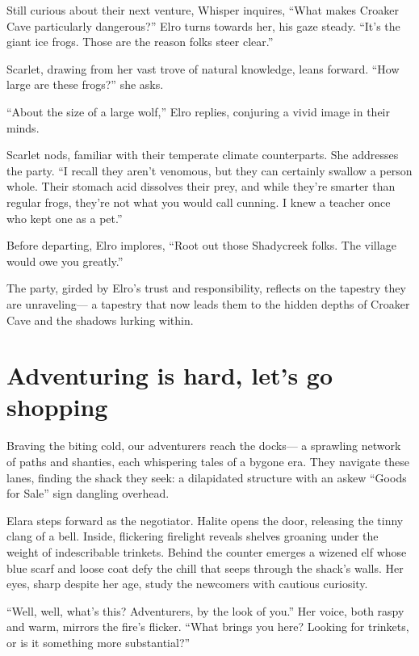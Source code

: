 \documentclass[
  letterpaper,12pt,twoside,twocolumn,openany,
  nodeprecatedcode,bg=full]{dndbook}
\begin{document}
Still curious about their next venture, Whisper inquires, ``What makes
Croaker Cave particularly dangerous?'' Elro turns towards her, his gaze
steady. ``It's the giant ice frogs. Those are the reason folks steer
clear.''

Scarlet, drawing from her vast trove of natural knowledge, leans
forward. ``How large are these frogs?'' she asks.

``About the size of a large wolf,'' Elro replies, conjuring a vivid
image in their minds.

Scarlet nods, familiar with their temperate climate counterparts. She
addresses the party. ``I recall they aren't venomous, but they can
certainly swallow a person whole. Their stomach acid dissolves their
prey, and while they're smarter than regular frogs, they're not what you
would call cunning. I knew a teacher once who kept one as a pet.''

Before departing, Elro implores, ``Root out those Shadycreek folks. The
village would owe you greatly.''

The party, girded by Elro's trust and responsibility, reflects on the
tapestry they are unraveling--- a tapestry that now leads them to the
hidden depths of Croaker Cave and the shadows lurking within.

\section{Adventuring is hard, let's go
shopping}\label{adventuring-is-hard-lets-go-shopping}

Braving the biting cold, our adventurers reach the docks--- a sprawling
network of paths and shanties, each whispering tales of a bygone era.
They navigate these lanes, finding the shack they seek: a dilapidated
structure with an askew ``Goods for Sale'' sign dangling overhead.

Elara steps forward as the negotiator. Halite opens the door, releasing
the tinny clang of a bell. Inside, flickering firelight reveals shelves
groaning under the weight of indescribable trinkets. Behind the counter
emerges a wizened elf whose blue scarf and loose coat defy the chill
that seeps through the shack's walls. Her eyes, sharp despite her age,
study the newcomers with cautious curiosity.

``Well, well, what's this? Adventurers, by the look of you.'' Her voice,
both raspy and warm, mirrors the fire's flicker. ``What brings you here?
Looking for trinkets, or is it something more substantial?''
\end{document}

